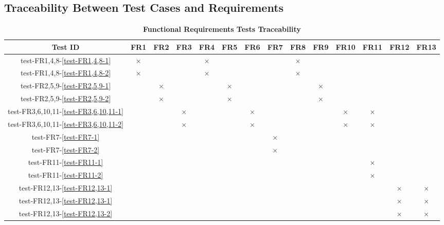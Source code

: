 \documentclass[12pt, titlepage]{article}
\begin{document}
\begin{landscape}
\subsection{Traceability Between Test Cases and Requirements} \label{section:4.4}

\begin{table}[H]
  \centering
  \begin{tabular}{|c|c|c|c|c|c|c|c|c|c|c|c|c|c|}
  \hline
   Test ID & FR1 & FR2 & FR3 & FR4 & FR5 & FR6 & FR7 & FR8 & FR9 & FR10 & FR11 & FR12 & FR13\\
  \hline
  test-FR1,4,8-\ref{test-FR1,4,8-1} & $\times$ & & & $\times$ & & & & $\times$ & & & & & \\
  \hline
  test-FR1,4,8-\ref{test-FR1,4,8-2} & $\times$ & & & $\times$ & & & & $\times$ & & & & & \\
  \hline
  test-FR2,5,9-\ref{test-FR2,5,9-1} & & $\times$ & & & $\times$ & & & & $\times$ & & & & \\
  \hline
  test-FR2,5,9-\ref{test-FR2,5,9-2} & & $\times$ & & & $\times$ & & & & $\times$ & & & & \\
  \hline
  test-FR3,6,10,11-\ref{test-FR3,6,10,11-1} & & & $\times$ & & & $\times$ & & & & $\times$ & $\times$ & & \\
  \hline
  test-FR3,6,10,11-\ref{test-FR3,6,10,11-2} & & & $\times$ & & & $\times$ & & & & $\times$ & $\times$ & & \\
  \hline
  test-FR7-\ref{test-FR7-1} & & & & & & & $\times$ & & & & & & \\
  \hline
  test-FR7-\ref{test-FR7-2} & & & & & & & $\times$ & & & & & & \\
  \hline
  test-FR11-\ref{test-FR11-1} & & & & & & & & & & & $\times$ & & \\
  \hline
  test-FR11-\ref{test-FR11-2} & & & & & & & & & & & $\times$ & & \\
  \hline
  test-FR12,13-\ref{test-FR12,13-1} & & & & & & & & & & & & $\times$ & $\times$ \\
  \hline
  test-FR12,13-\ref{test-FR12,13-1} & & & & & & & & & & & & $\times$ & $\times$ \\
  \hline
  test-FR12,13-\ref{test-FR12,13-2} & & & & & & & & & & & & $\times$ & $\times$ \\
  \hline
\end{tabular}
\caption{\bf Functional Requirements Tests Traceability} \label{tab:fr-test-traceability}
\end{table}



\end{landscape}
\end{document}
